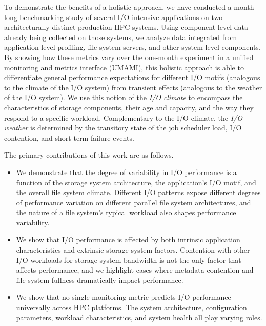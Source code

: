To demonstrate the benefits of a holistic approach, we have conducted a month-long benchmarking study of several I/O-intensive applications on two architecturally distinct production HPC systems.
Using component-level data already being collected on those systems, we analyze data integrated from application-level profiling, file system servers, and other system-level components.
By showing how these metrics vary over the one-month experiment in a unified monitoring and metrics interface (UMAMI), this holistic approach is able to differentiate general performance expectations for different I/O motifs (analogous to the climate of the I/O system) from transient effects (analogous to the weather of the I/O system).
We use this notion of the \emph{I/O climate} to encompass the characteristics of storage components, their age and capacity, and the way they respond to a specific workload.
Complementary to the I/O climate, the \emph{I/O weather} is determined by the transitory state of the job scheduler load, I/O contention, and short-term failure events.

The primary contributions of this work are as follows.

\begin{itemize}[leftmargin=*]

\item We demonstrate that the degree of variability in I/O performance is a function of the storage system architecture, the application's I/O motif, and the overall file system climate.
Different I/O patterns expose different degrees of performance variation on different parallel file system architectures, and the nature of a file system's typical workload also shapes performance variability.

\item We show that I/O performance is affected by both intrinsic application characteristics and extrinsic storage system factors.
Contention with other I/O workloads for storage system bandwidth is not the only factor that affects performance, and
we highlight cases where metadata contention and file system fullness dramatically impact performance.

\item We show that no single monitoring metric predicts I/O performance universally across HPC platforms.
The system architecture, configuration parameters, workload characteristics,
and system health all play varying roles.

\end{itemize}
